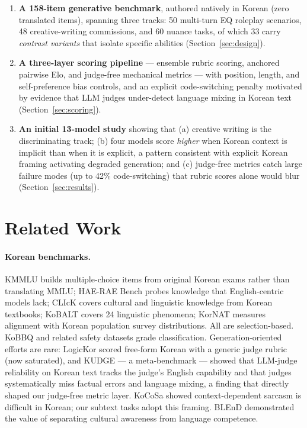 \documentclass[11pt]{article}
\begin{document}
\begin{enumerate}
\item \textbf{A 158-item generative benchmark}, authored natively in Korean
(zero translated items), spanning three tracks: 50 multi-turn EQ roleplay
scenarios, 48 creative-writing commissions, and 60 nuance tasks, of which 33
carry \emph{contrast variants} that isolate specific abilities
(Section~\ref{sec:design}).
\item \textbf{A three-layer scoring pipeline} --- ensemble rubric scoring,
anchored pairwise Elo, and judge-free mechanical metrics --- with position,
length, and self-preference bias controls, and an explicit code-switching
penalty motivated by evidence that LLM judges under-detect language mixing
in Korean text \citep{son2024kudge} (Section~\ref{sec:scoring}).
\item \textbf{An initial 13-model study} showing that (a) creative writing
is the discriminating track; (b) four models score \emph{higher} when
Korean context is implicit than when it is explicit, a pattern consistent
with explicit Korean framing activating degraded generation; and (c) judge-free metrics
catch large failure modes (up to 42\% code-switching) that rubric scores
alone would blur (Section~\ref{sec:results}).
\end{enumerate}

\section{Related Work}

\paragraph{Korean benchmarks.} KMMLU \citep{son2024kmmlu} builds
multiple-choice items from original Korean exams rather than translating
MMLU; HAE-RAE Bench \citep{son2023haerae} probes knowledge that
English-centric models lack; CLIcK \citep{kim2024click} covers cultural and
linguistic knowledge from Korean textbooks; KoBALT \citep{kobalt2025}
covers 24 linguistic phenomena; KorNAT \citep{lee2024kornat} measures
alignment with Korean population survey distributions. All are
selection-based. KoBBQ \citep{jin2023kobbq} and related safety datasets
grade classification. Generation-oriented efforts are rare: LogicKor scored
free-form Korean with a generic judge rubric (now saturated), and KUDGE
\citep{son2024kudge} --- a meta-benchmark --- showed that LLM-judge
reliability on Korean text tracks the judge's English capability and that
judges systematically miss factual errors and language mixing, a finding
that directly shaped our judge-free metric layer. KoCoSa
\citep{kim2024kocosa} showed context-dependent sarcasm is difficult in
Korean; our subtext tasks adopt this framing. BLEnD \citep{myung2024blend}
demonstrated the value of separating cultural awareness from language
competence.
\end{document}
